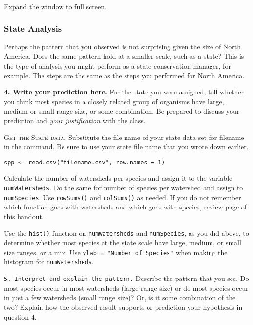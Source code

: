 \documentclass[11pt]{article}
\begin{document}
Expand the window to full screen. 

\subsubsection*{State Analysis}

Perhaps the pattern that you observed is not surprising given the size
of North America. Does the same pattern hold at a smaller scale, such as a state?
This is the type of analysis you might perform as a state conservation
manager, for example. The steps are the same as the steps you
performed for North America.

\textbf{4. Write your prediction here.} For the state you were assigned, 
tell whether you think most species in a closely related
group of organisms have large, medium or small range size, or some
combination. Be prepared to discuss your prediction and \emph{your
justification} with the class.

\vspace{7\baselineskip}

\textsc{Get the State data.} Substitute the file name of your state data set for filename in
the command. Be sure to use your state file name that you wrote down
earlier.


\texttt{spp \textless{}-
read.csv("filename.csv", row.names = 1)}

Calculate the number of watersheds per species and assign it to the
variable \texttt{numWatersheds}. Do the same for number of species per
watershed and assign to \texttt{numSpecies}. Use \texttt{rowSums()} and
\texttt{colSums()} as needed. If you do not remember which function goes
with watersheds and which goes with species, review page \pageref{tab:colrowsums} of this handout.

Use the \texttt{hist()} function on \texttt{numWatersheds} and \texttt{numSpecies}, as you did above,
to determine whether most species at the state scale have large, medium, or
small size ranges, or a mix.  Use \texttt{ylab = "Number of Species"} when making the histogram
for \texttt{numWatersheds}. 

\texttt{5. Interpret and explain the pattern.} Describe the pattern that you see. Do most
species occur in most watersheds (large range size) or do most species
occur in just a few watersheds (small range size)? Or, is it some
combination of the two? Explain how the observed result supports or
prediction your hypothesis in question 4.
\end{document}
